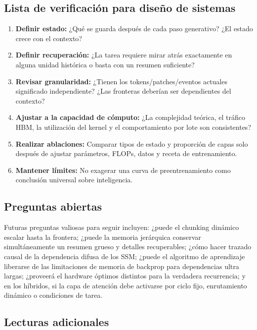 \subsection{Lista de verificación para diseño de sistemas}

\begin{enumerate}
  \item \textbf{Definir estado:} ¿Qué se guarda después de cada paso generativo? ¿El estado crece con el contexto?
  \item \textbf{Definir recuperación:} ¿La tarea requiere mirar atrás exactamente en alguna unidad histórica o basta con un resumen suficiente?
  \item \textbf{Revisar granularidad:} ¿Tienen los tokens/patches/eventos actuales significado independiente? ¿Las fronteras deberían ser dependientes del contexto?
  \item \textbf{Ajustar a la capacidad de cómputo:} ¿La complejidad teórica, el tráfico HBM, la utilización del kernel y el comportamiento por lote son consistentes?
  \item \textbf{Realizar ablaciones:} Comparar tipos de estado y proporción de capas solo después de ajustar parámetros, FLOPs, datos y receta de entrenamiento.
  \item \textbf{Mantener límites:} No exagerar una curva de preentrenamiento como conclusión universal sobre inteligencia.
\end{enumerate}

\subsection{Preguntas abiertas}

Futuras preguntas valiosas para seguir incluyen: ¿puede el chunking dinámico escalar hasta la frontera; ¿puede la memoria jerárquica conservar simultáneamente un resumen grueso y detalles recuperables; ¿cómo hacer trazado causal de la dependencia difusa de los SSM; ¿puede el algoritmo de aprendizaje liberarse de las limitaciones de memoria de backprop para dependencias ultra largas; ¿proveerá el hardware óptimos distintos para la verdadera recurrencia; y en los híbridos, si la capa de atención debe activarse por ciclo fijo, enrutamiento dinámico o condiciones de tarea.

\subsection{Lecturas adicionales}

